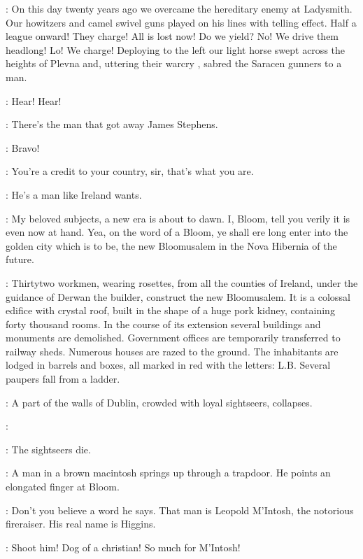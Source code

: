 \Bloom:
On this day twenty years ago we overcame the hereditary enemy at Ladysmith.
Our howitzers and camel swivel guns played on his lines with telling effect.
Half a league onward!
They charge!
All is lost now!
Do we yield?
No!
We drive them headlong!
Lo! We charge!
Deploying to the left our light horse swept across the heights of Plevna
and, uttering their warcry ,
sabred the Saracen gunners to a man.

\Typesetters[1]:
Hear! Hear!

\JohnWyse[2]:
There's the man that got away James Stephens.

\Bluecoat[1]:
Bravo!

\OldResident[2]:
You're a credit to your country, sir, that's what you are.

\AppleWoman[1]:
He's a man like Ireland wants.

\Bloom:
My beloved subjects, a new era is about to dawn.
I, Bloom, tell you verily it is even now at hand.
Yea, on the word of a Bloom, ye shall ere long
enter into the golden city which is to be, the new Bloomusalem
in the Nova Hibernia of the future.

:
Thirtytwo workmen, wearing rosettes, from all the counties of Ireland,
under the guidance of Derwan the builder, construct the new Bloomusalem.
It is a colossal edifice with crystal roof,
built in the shape of a huge pork kidney, containing forty thousand rooms.
In the course of its extension
several buildings and monuments are demolished.
Government offices are temporarily transferred to railway sheds.
Numerous houses are razed to the ground.
The inhabitants are lodged in barrels and boxes,
all marked in red with the letters: L.B.
Several paupers fall from a ladder.

:
A part of the walls of Dublin, crowded with loyal sightseers, collapses.

\Sightseers:


:
The sightseers die.

:
A man in a brown macintosh springs up through a trapdoor.
He points an elongated finger at Bloom.

\Macintosh:
Don't you believe a word he says.
That man is Leopold M'Intosh, the notorious fireraiser.
His real name is Higgins.

\Bloom:
Shoot him!
Dog of a christian!
So much for M'Intosh!


